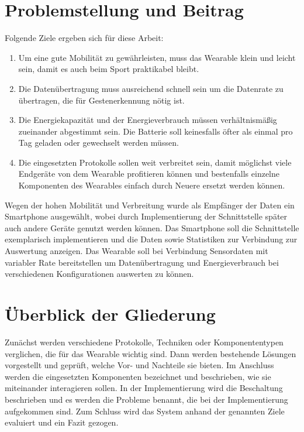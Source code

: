\section{Problemstellung und Beitrag}
\label{ch:aims}
Folgende Ziele ergeben sich für diese Arbeit:
\begin{enumerate}
	\item Um eine gute Mobilität zu gewährleisten, muss das Wearable klein und leicht sein, damit es auch beim Sport praktikabel bleibt.
	\item Die Datenübertragung muss ausreichend schnell sein um die Datenrate zu übertragen, die für Gestenerkennung nötig ist.
	\item Die Energiekapazität und der Energieverbrauch müssen verhältnismäßig zueinander abgestimmt sein.
	Die Batterie soll keinesfalls öfter als einmal pro Tag geladen oder gewechselt werden müssen.
	\item Die eingesetzten Protokolle sollen weit verbreitet sein, damit möglichst viele Endgeräte von dem Wearable profitieren können und bestenfalls einzelne Komponenten des Wearables einfach durch Neuere ersetzt werden können.
\end{enumerate}
Wegen der hohen Mobilität und Verbreitung wurde als Empfänger der Daten ein Smartphone ausgewählt, wobei durch Implementierung der Schnittstelle später auch andere Geräte genutzt werden können.
Das Smartphone soll die Schnittstelle exemplarisch implementieren und die Daten sowie Statistiken zur Verbindung zur Auswertung anzeigen.
Das Wearable soll bei Verbindung Sensordaten mit variabler Rate bereitstellen um Datenübertragung und Energieverbrauch bei verschiedenen Konfigurationen auswerten zu können.

\section{Überblick der Gliederung}
Zunächst werden verschiedene Protokolle, Techniken oder Komponententypen verglichen, die für das Wearable wichtig sind.
Dann werden bestehende Lösungen vorgestellt und geprüft, welche Vor- und Nachteile sie bieten.
Im Anschluss werden die eingesetzten Komponenten bezeichnet und beschrieben, wie sie miteinander interagieren sollen.
In der Implementierung wird die Beschaltung beschrieben und es werden die Probleme benannt, die bei der Implementierung aufgekommen sind.
Zum Schluss wird das System anhand der genannten Ziele evaluiert und ein Fazit gezogen.
